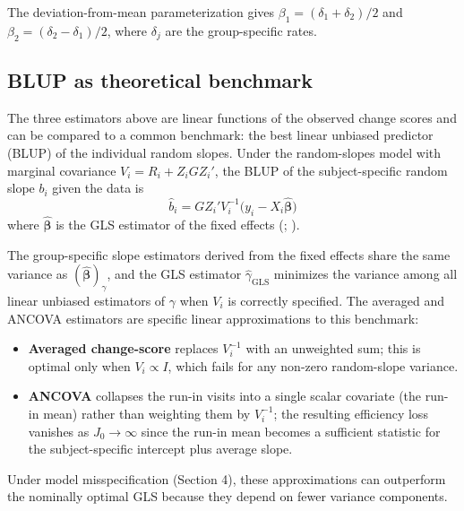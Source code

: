 \documentclass[
  11pt,
]{article}
\providecommand{\tightlist}{%
  \setlength{\itemsep}{0pt}\setlength{\parskip}{0pt}}
\begin{document}
The deviation-from-mean parameterization gives
\(\beta_1 = (\delta_1 + \delta_2)/2\) and
\(\beta_2 = (\delta_2 - \delta_1)/2\), where \(\delta_j\) are the
group-specific rates.

\subsection{BLUP as theoretical
benchmark}\label{blup-as-theoretical-benchmark}

The three estimators above are linear functions of the observed change
scores and can be compared to a common benchmark: the best linear
unbiased predictor (BLUP) of the individual random slopes. Under the
random-slopes model with marginal covariance \(V_i = R_i + Z_i G Z_i'\),
the BLUP of the subject-specific random slope \(b_i\) given the data is
\begin{equation}
  \hat b_i
  = G Z_i' V_i^{-1}
    \bigl(y_i - X_i \hat{\boldsymbol{\beta}}\bigr)
  \label{eq:blup}
\end{equation} where \(\hat{\boldsymbol{\beta}}\) is the GLS estimator
of the fixed effects (;
).

The group-specific slope estimators derived from the fixed effects share
the same variance as \((\hat{\boldsymbol{\beta}})_\gamma\), and the GLS
estimator \(\hat\gamma_{\text{GLS}}\) minimizes the variance among all
linear unbiased estimators of \(\gamma\) when \(V_i\) is correctly
specified. The averaged and ANCOVA estimators are specific linear
approximations to this benchmark:

\begin{itemize}
\tightlist
\item
  \textbf{Averaged change-score} replaces \(V_i^{-1}\) with an
  unweighted sum; this is optimal only when \(V_i \propto I\), which
  fails for any non-zero random-slope variance.
\item
  \textbf{ANCOVA} collapses the run-in visits into a single scalar
  covariate (the run-in mean) rather than weighting them by
  \(V_i^{-1}\); the resulting efficiency loss vanishes as
  \(J_0 \to \infty\) since the run-in mean becomes a sufficient
  statistic for the subject-specific intercept plus average slope.
\end{itemize}

Under model misspecification (Section 4), these approximations can
outperform the nominally optimal GLS because they depend on fewer
variance components.
\end{document}
